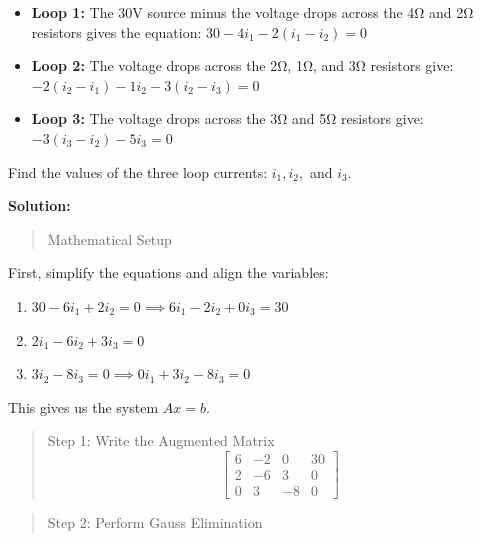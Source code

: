 \documentclass[
  letterpaper,
  DIV=11,
  numbers=noendperiod]{scrreprt}
\begin{document}
\begin{itemize}
\item
  \textbf{Loop 1:} The 30V source minus the voltage drops across the 4Ω
  and 2Ω resistors gives the equation: \(30 - 4i_1 - 2(i_1 - i_2) = 0\)
\item
  \textbf{Loop 2:} The voltage drops across the 2Ω, 1Ω, and 3Ω resistors
  give: \(-2(i_2 - i_1) - 1i_2 - 3(i_2 - i_3) = 0\)
\item
  \textbf{Loop 3:} The voltage drops across the 3Ω and 5Ω resistors
  give: \(-3(i_3 - i_2) - 5i_3 = 0\)
\end{itemize}

Find the values of the three loop currents: \(i_1, i_2,\) and \(i_3\).

\textbf{Solution:}

\begin{quote}
Mathematical Setup
\end{quote}

First, simplify the equations and align the variables:

\begin{enumerate}
\def\labelenumi{\arabic{enumi}.}
\item
  \(30 - 6i_1 + 2i_2 = 0 \implies 6i_1 - 2i_2 + 0i_3 = 30\)
\item
  \(2i_1 - 6i_2 + 3i_3 = 0\)
\item
  \(3i_2 - 8i_3 = 0 \implies 0i_1 + 3i_2 - 8i_3 = 0\)
\end{enumerate}

This gives us the system \(Ax=b\).

\begin{quote}
Step 1: Write the Augmented Matrix \[
\left[
\begin{array}{ccc|c}
6 & -2 & 0 & 30 \\
2 & -6 & 3 & 0 \\
0 & 3 & -8 & 0
\end{array}
\right]
\]
\end{quote}

\begin{quote}
Step 2: Perform Gauss Elimination
\end{quote}
\end{document}
